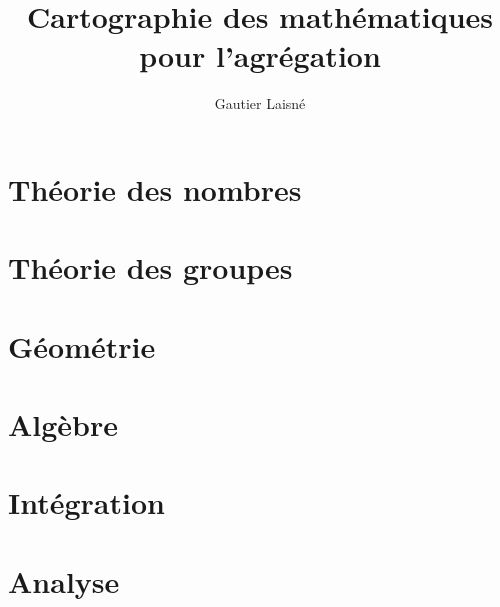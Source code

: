 \documentclass[a4paper, 11pt, twocolumn, oneside, openright]{report}
\theoremstyle{definition}
\begin{document}
\title{Cartographie des mathématiques pour l'agrégation}
\author{Gautier Laisné}
\date{}
\maketitle

\begingroup
\hypersetup{linkcolor=black}
\tableofcontents
\endgroup

\part{Théorie des nombres}


\part{Théorie des groupes}




\part{Géométrie}





\part{Algèbre}





\part{Intégration}




\part{Analyse}





\end{document}
